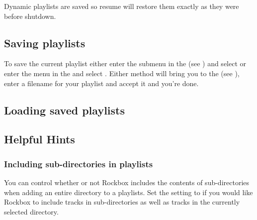 Dynamic playlists are saved so resume will restore them exactly as they
were before shutdown.

\subsection{Saving playlists}
To save the current playlist either enter the  submenu
in the  (see ) and
select  or enter the
 menu in the  and select
.
Either method will bring you to the  (see
), enter a filename for your playlist and
accept it and you're done.

\subsection{Loading saved playlists}

\subsection{Helpful Hints}

\subsubsection{Including sub-directories in playlists}
You can control whether or not Rockbox includes the contents of
sub-directories when adding an entire directory to a playlists.
Set the  setting to  if you would like
Rockbox to include tracks in sub-directories as well as tracks in the
currently selected directory.
